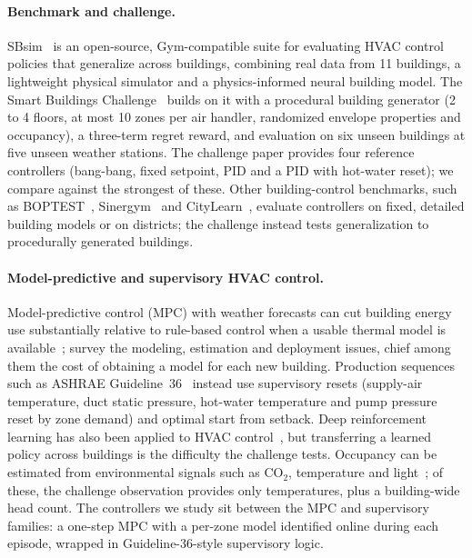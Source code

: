 \documentclass{article}
\begin{document}
\paragraph{Benchmark and challenge.} SBsim~\citep{goldfeder2024smart} is an open-source, Gym-compatible suite for evaluating HVAC control policies that generalize across buildings, combining real data from 11 buildings, a lightweight physical simulator and a physics-informed neural building model. The Smart Buildings Challenge~\citep{goldfeder2026smart} builds on it with a procedural building generator (2 to 4 floors, at most 10 zones per air handler, randomized envelope properties and occupancy), a three-term regret reward, and evaluation on six unseen buildings at five unseen weather stations. The challenge paper provides four reference controllers (bang-bang, fixed setpoint, PID and a PID with hot-water reset); we compare against the strongest of these. Other building-control benchmarks, such as BOPTEST~\citep{blum2021boptest}, Sinergym~\citep{jimenez2021sinergym} and CityLearn~\citep{vazquez2019citylearn}, evaluate controllers on fixed, detailed building models or on districts; the challenge instead tests generalization to procedurally generated buildings.

\paragraph{Model-predictive and supervisory HVAC control.} Model-predictive control (MPC) with weather forecasts can cut building energy use substantially relative to rule-based control when a usable thermal model is available~\citep{oldewurtel2012use}; \citet{drgona2020all} survey the modeling, estimation and deployment issues, chief among them the cost of obtaining a model for each new building. Production sequences such as ASHRAE Guideline~36~\citep{ashrae2018g36} instead use supervisory resets (supply-air temperature, duct static pressure, hot-water temperature and pump pressure reset by zone demand) and optimal start from setback. Deep reinforcement learning has also been applied to HVAC control~\citep{wei2017deep}, but transferring a learned policy across buildings is the difficulty the challenge tests. Occupancy can be estimated from environmental signals such as CO$_2$, temperature and light~\citep{candanedo2016accurate}; of these, the challenge observation provides only temperatures, plus a building-wide head count. The controllers we study sit between the MPC and supervisory families: a one-step MPC with a per-zone model identified online during each episode, wrapped in Guideline-36-style supervisory logic.
\end{document}
